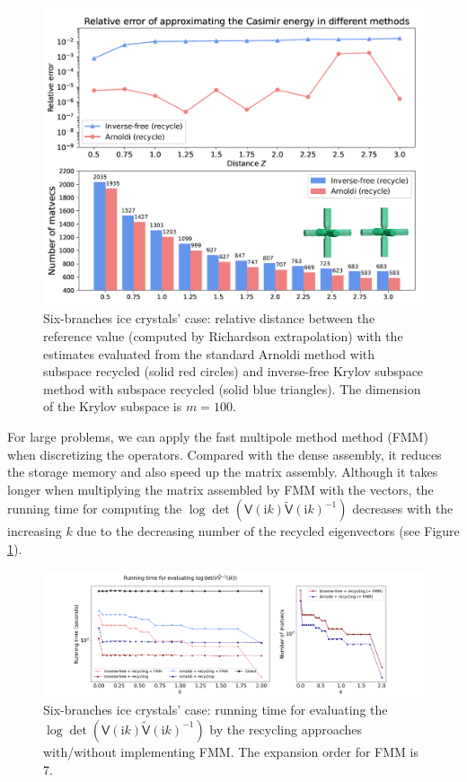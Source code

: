         \begin{figure}[H]
                \centering
                \includegraphics[scale = 1]{figures/6branches_rel_err.png}
                \caption{Six-branches ice crystals' case: relative distance between the reference value (computed by Richardson extrapolation) with the estimates evaluated from the standard Arnoldi 
                method with subspace recycled (solid red circles) and inverse-free Krylov subspace method with subspace recycled (solid blue triangles). The dimension of the Krylov subspace is $m = 100$.}       
             \end{figure}
For large problems, we can apply the fast multipole method method (FMM)\cite{ying2004kernel} when discretizing the operators. Compared with the dense assembly, it reduces 
the storage memory and also speed up the matrix assembly. Although it takes longer when multiplying the matrix assembled by FMM with the vectors, the running time 
for computing the $\log\det(\mathsf{V}(\mathrm{i}k)\tilde{\mathsf{V}}(\mathrm{i}k)^{-1})$ decreases with the increasing $k$ due to the decreasing number of 
the recycled eigenvectors (see Figure \ref{running_time_fmm}). 
\begin{figure}[H]
    \centering
    \includegraphics[width = \textwidth]{figures/running_time_fmm.png}
    \caption{Six-branches ice crystals' case: running time for evaluating the $\log\det(\mathsf{V}(\mathrm{i}k)\tilde{\mathsf{V}}(\mathrm{i}k)^{-1})$ by the recycling approaches with/without 
    implementing FMM. The expansion order for FMM is 7.}
    \label{running_time_fmm}
\end{figure}        
